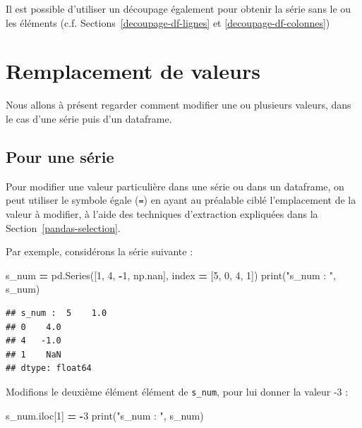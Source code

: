 \documentclass[12pt,]{book}
\newenvironment{Shaded}{\begin{snugshade}}{\end{snugshade}}
\newcommand{\DecValTok}[1]{\textcolor[rgb]{0.00,0.00,0.81}{#1}}
\newcommand{\StringTok}[1]{\textcolor[rgb]{0.31,0.60,0.02}{#1}}
\newcommand{\OperatorTok}[1]{\textcolor[rgb]{0.81,0.36,0.00}{\textbf{#1}}}
\newcommand{\BuiltInTok}[1]{#1}
\newcommand{\NormalTok}[1]{#1}
\numberwithin{equation}{section}
\numberwithin{countremarque}{section}
\begin{document}
Il est possible d'utiliser un découpage également pour obtenir la série
sans le ou les éléments (c.f. Sections~\ref{decoupage-df-lignes} et
\ref{decoupage-df-colonnes})

\section{Remplacement de valeurs}\label{remplacement-de-valeurs}

Nous allons à présent regarder comment modifier une ou plusieurs
valeurs, dans le cas d'une série puis d'un dataframe.

\subsection{Pour une série}\label{pour-une-serie}

Pour modifier une valeur particulière dans une série ou dans un
dataframe, on peut utiliser le symbole égale (\texttt{=}) en ayant au
préalable ciblé l'emplacement de la valeur à modifier, à l'aide des
techniques d'extraction expliquées dans la
Section~\ref{pandas-selection}.

Par exemple, considérons la série suivante :

\begin{Shaded}
\begin{Highlighting}[]
\NormalTok{s_num }\OperatorTok{=}\NormalTok{ pd.Series([}\DecValTok{1}\NormalTok{, }\DecValTok{4}\NormalTok{, }\OperatorTok{-}\DecValTok{1}\NormalTok{, np.nan],}
\NormalTok{             index }\OperatorTok{=}\NormalTok{ [}\DecValTok{5}\NormalTok{, }\DecValTok{0}\NormalTok{, }\DecValTok{4}\NormalTok{, }\DecValTok{1}\NormalTok{])}
\BuiltInTok{print}\NormalTok{(}\StringTok{"s_num : "}\NormalTok{, s_num)}
\end{Highlighting}
\end{Shaded}

\begin{lstlisting}
## s_num :  5    1.0
## 0    4.0
## 4   -1.0
## 1    NaN
## dtype: float64
\end{lstlisting}

Modifions le deuxième élément élément de \texttt{s\_num}, pour lui
donner la valeur -3 :

\begin{Shaded}
\begin{Highlighting}[]
\NormalTok{s_num.iloc[}\DecValTok{1}\NormalTok{] }\OperatorTok{=} \OperatorTok{-}\DecValTok{3}
\BuiltInTok{print}\NormalTok{(}\StringTok{"s_num : "}\NormalTok{, s_num)}
\end{Highlighting}
\end{Shaded}
\end{document}
